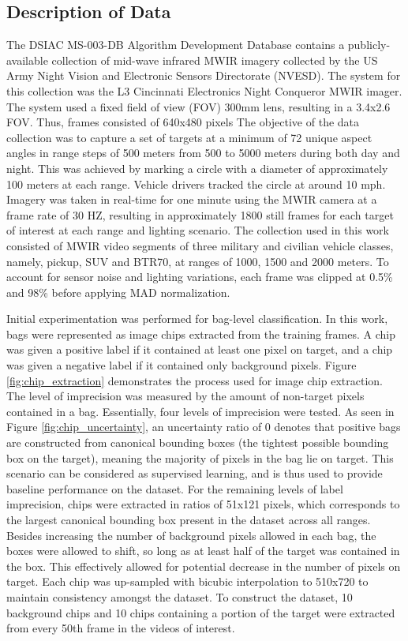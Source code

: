 \subsection{Description of Data}
The DSIAC MS-003-DB Algorithm Development Database \citep{DSIACATR} contains a publicly-available collection of mid-wave infrared MWIR imagery collected by the US Army Night Vision and Electronic Sensors Directorate (NVESD). The system for this collection was the L3 Cincinnati Electronics Night Conqueror MWIR imager. The system used a fixed field of view (FOV) 300mm lens, resulting in a 3.4x2.6 FOV.  Thus, frames consisted of 640x480 pixels  The objective of the data collection was to capture a set of targets at a minimum of 72 unique aspect angles in range steps of 500 meters from 500 to 5000 meters during both day and night.  This was achieved by marking a circle with a diameter of approximately 100 meters at each range.  Vehicle drivers tracked the circle at around 10 mph. Imagery was taken in real-time for one minute using the  MWIR camera at a frame rate of 30 HZ, resulting in approximately 1800 still frames for each target of interest at each range and lighting scenario.  The collection used in this work consisted of MWIR video segments of three military and civilian vehicle classes, namely, pickup, SUV and BTR70, at ranges of 1000, 1500 and 2000 meters.  To account for sensor noise and lighting variations,  each frame was clipped at 0.5\% and 98\% before applying MAD normalization.
 
Initial experimentation was performed for bag-level classification.  In this work, bags were represented as image chips extracted from the training frames.  A chip was given a positive label if it contained at least one pixel on target, and a chip was given a negative label if it contained only background pixels.   Figure \ref{fig:chip_extraction} demonstrates the process used for image chip extraction.  The level of imprecision was measured by the amount of non-target pixels contained in a bag.  Essentially, four levels of imprecision were tested.  As seen in Figure \ref{fig:chip_uncertainty}, an uncertainty ratio of 0 denotes that positive bags are constructed from canonical bounding boxes (the tightest possible bounding box on the target), meaning the majority of pixels in the bag lie on target.  This scenario can be considered as supervised learning, and is thus used to provide baseline performance on the dataset. For the remaining levels of label imprecision, chips were extracted in ratios of 51x121 pixels, which corresponds to the largest canonical bounding box present in the dataset across all ranges.  Besides increasing the number of background pixels allowed in each bag, the boxes were  allowed to shift, so long as at least half of the target was contained in the box.  This effectively allowed for potential decrease in the number of pixels on target.  Each chip was up-sampled with bicubic interpolation to 510x720 to maintain consistency amongst the dataset.  To construct the dataset, 10 background chips and 10 chips containing a portion of the target were extracted from every 50th frame in the videos of interest.


